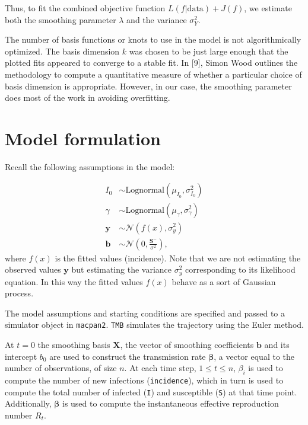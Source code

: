 \documentclass[
11pt, %
oneside, %
english, %
singlespacing, %
]{macthesis} %
\begin{document}
Thus, to fit the combined objective function \(L(f|\text{data}) + J(f)\), we estimate both the smoothing parameter \(\lambda\) and the variance \(\sigma^2_Y\).

The number of basis functions or knots to use in the model is not algorithmically optimized. The basis dimension \(k\) was chosen to be just large enough that the plotted fits appeared to converge to a stable fit. In {[}9{]}, Simon Wood outlines the methodology to compute a quantitative measure of whether a particular choice of basis dimension is appropriate. However, in our case, the smoothing parameter does most of the work in avoiding overfitting.

\section{Model formulation}\label{Model-formulation}

Recall the following assumptions in the model:

\[
\begin{aligned}
I_0 &\sim \text{Lognormal}(\mu_{I_0}, \sigma^2_{I_0}) \\
\gamma &\sim \text{Lognormal}(\mu_{\gamma}, \sigma^2_{\gamma}) \\
\mathbf{y} &\sim \mathcal{N}(f(x), \sigma^2_y) \\
\mathbf{b} &\sim \mathcal{N}(0, \frac{\mathbf{S}^{-}}{\sigma^2}),
\end{aligned}
\]
where \(f(x)\) is the fitted values (incidence). Note that
we are not estimating the observed values \(\mathbf{y}\) but estimating the variance \(\sigma^2_y\) corresponding to its likelihood equation. In this way the fitted values \(f(x)\) behave as a sort of Gaussian process.

The model assumptions and starting conditions are specified and passed to a simulator object in \texttt{macpan2}. \texttt{TMB} simulates the trajectory using the Euler method.

At \(t= 0\) the smoothing basis \(\mathbf{X}\), the vector of smoothing coefficients \(\mathbf{b}\) and its intercept \(b_0\) are used to construct the transmission rate \(\boldsymbol{\beta}\), a vector equal to the number of observations, of size \(n\). At each time step, \(1 \leq t \leq n\), \(\beta_i\) is used to compute the number of new infections (\texttt{incidence}), which in turn is used to compute the total number of infected (\texttt{I}) and susceptible (\texttt{S}) at that time point. Additionally, \(\boldsymbol{\beta}\) is used to compute the instantaneous effective reproduction number \(R_t\).
\end{document}
